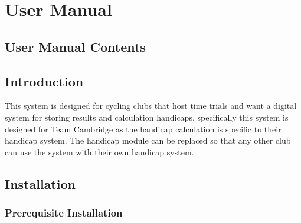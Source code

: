 \chapter{User Manual}
\startcontents[UserManual]
\section{User Manual Contents}


\section{Introduction}
This system is designed for cycling clubs that host time trials and want a digital system for storing results and calculation handicaps. specifically this system is designed for Team Cambridge as the handicap calculation is specific to their handicap system. The handicap module can be replaced so that any other club can use the system with their own handicap system.
\section{Installation}

\subsection{Prerequisite Installation}


